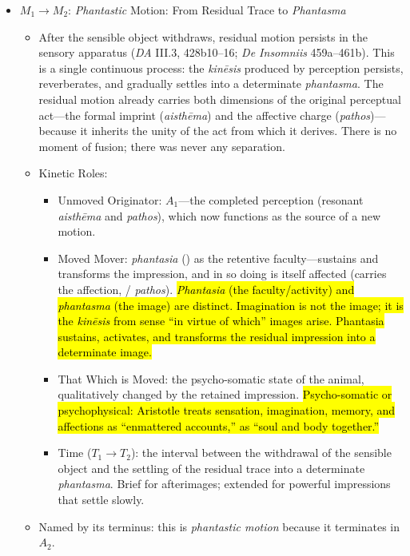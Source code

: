 \begin{itemize}
\begin{itemize}
        \item $M_1 \rightarrow M_2$: \textit{Phantastic} Motion: From Residual Trace to \textit{Phantasma}
        \begin{itemize}
            \item After the sensible object withdraws, residual motion persists in the sensory apparatus (\textit{DA} III.3, 428b10--16; \textit{De Insomniis} 459a--461b). This is a single continuous process: the \textit{kinēsis} produced by perception persists, reverberates, and gradually settles into a determinate \textit{phantasma}. The residual motion already carries both dimensions of the original perceptual act---the formal imprint (\textit{aisthēma}) and the affective charge (\textit{pathos})---because it inherits the unity of the act from which it derives. There is no moment of fusion; there was never any separation.
            \item Kinetic Roles:
            \begin{itemize}
                \item Unmoved Originator: $A_1$---the completed perception (resonant \textit{aisthēma} and \textit{pathos}), which now functions as the source of a new motion.
                \item Moved Mover: \textit{phantasia} () as the retentive faculty---sustains and transforms the impression, and in so doing is itself affected (carries the affection,  / \textit{pathos}). \hl{\textit{Phantasia} (the faculty/activity) and \textit{phantasma} (the image) are distinct. Imagination is not the image; it is the \textit{kinēsis} from sense ``in virtue of which'' images arise. Phantasia sustains, activates, and transforms the residual impression into a determinate image.}
                \item That Which is Moved: the psycho-somatic state of the animal, qualitatively changed by the retained impression. \hl{Psycho-somatic or psychophysical: Aristotle treats sensation, imagination, memory, and affections as ``enmattered accounts,'' as ``soul and body together.''}
                \item Time ($T_1 \rightarrow T_2$): the interval between the withdrawal of the sensible object and the settling of the residual trace into a determinate \textit{phantasma}. Brief for afterimages; extended for powerful impressions that settle slowly.
            \end{itemize}
        \item Named by its terminus: this is \textit{phantastic motion} because it terminates in $A_2$.
        \end{itemize}
    \end{itemize}
\end{itemize}

